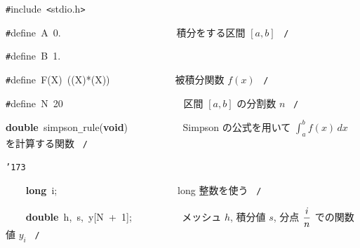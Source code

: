 \documentclass[a4paper,10pt]{article}
\def\mc{\relax}
\begin{document}
\noindent
\mbox{}{\tt\#}include{\tt\mc \ }{\tt <}stdio.h{\tt >}

\noindent
\mbox{}{\tt\#}define{\tt\mc \ }A{\tt\mc \ }0.{\tt\mc \ }{\tt\mc \ }{\tt\mc \ }{\tt\mc \ }{\tt\mc \ }{\tt\mc \ }{\tt\mc \ }{\tt\mc \ }{\tt\mc \ }{\tt\mc \ }{\tt\mc \ }{\tt\mc \ }{\tt\mc \ }{\tt\mc \ }{\tt\mc \ }{\tt\mc \ }{\tt\mc \ }{\tt\mc \ }{\tt\mc \ }{\tt\mc \ }{\tt\mc \ }{\tt\mc \ }\rm\mc {\tt /}{\tt *}\  積分をする区間 $[a, b]$ \hfill \rm\mc \ {\tt *}{\tt /}
\tt\mc 

\noindent
\mbox{}{\tt\#}define{\tt\mc \ }B{\tt\mc \ }1.

\noindent
\mbox{}{\tt\#}define{\tt\mc \ }F(X){\tt\mc \ }((X)*(X)){\tt\mc \ }{\tt\mc \ }{\tt\mc \ }{\tt\mc \ }{\tt\mc \ }{\tt\mc \ }{\tt\mc \ }{\tt\mc \ }{\tt\mc \ }{\tt\mc \ }{\tt\mc \ }{\tt\mc \ }\rm\mc {\tt /}{\tt *}\  被積分関数 $f(x)$ \hfill \rm\mc \ {\tt *}{\tt /}
\tt\mc 

\noindent
\mbox{}{\tt\#}define{\tt\mc \ }N{\tt\mc \ }20{\tt\mc \ }{\tt\mc \ }{\tt\mc \ }{\tt\mc \ }{\tt\mc \ }{\tt\mc \ }{\tt\mc \ }{\tt\mc \ }{\tt\mc \ }{\tt\mc \ }{\tt\mc \ }{\tt\mc \ }{\tt\mc \ }{\tt\mc \ }{\tt\mc \ }{\tt\mc \ }{\tt\mc \ }{\tt\mc \ }{\tt\mc \ }{\tt\mc \ }{\tt\mc \ }{\tt\mc \ }\rm\mc {\tt /}{\tt *}\  \ 区間 $[a, b]$ の分割数 $n$ \hfill \rm\mc \ {\tt *}{\tt /}
\tt\mc 

\noindent
\mbox{}\hfill

\noindent
\mbox{}\textbf{double}{\tt\mc \ }simpson{\tt\_}rule(\textbf{void}){\tt\mc \ }{\tt\mc \ }{\tt\mc \ }{\tt\mc \ }{\tt\mc \ }{\tt\mc \ }{\tt\mc \ }{\tt\mc \ }{\tt\mc \ }\rm\mc {\tt /}{\tt *}\  \ Simpson の公式を用いて $\displaystyle\int_a^b f(x)\,dx$ を計算する関数 \hfill \rm\mc \ {\tt *}{\tt /}
\tt\mc 

\noindent
\mbox{}{\tt\char'173}

\noindent
\mbox{}{\tt\mc \ }{\tt\mc \ }{\tt\mc \ }{\tt\mc \ }\textbf{long}{\tt\mc \ }i;{\tt\mc \ }{\tt\mc \ }{\tt\mc \ }{\tt\mc \ }{\tt\mc \ }{\tt\mc \ }{\tt\mc \ }{\tt\mc \ }{\tt\mc \ }{\tt\mc \ }{\tt\mc \ }{\tt\mc \ }{\tt\mc \ }{\tt\mc \ }{\tt\mc \ }{\tt\mc \ }{\tt\mc \ }{\tt\mc \ }{\tt\mc \ }{\tt\mc \ }{\tt\mc \ }{\tt\mc \ }{\tt\mc \ }\rm\mc {\tt /}{\tt *}\  long 整数を使う \hfill \rm\mc \ {\tt *}{\tt /}
\tt\mc 

\noindent
\mbox{}{\tt\mc \ }{\tt\mc \ }{\tt\mc \ }{\tt\mc \ }\textbf{double}{\tt\mc \ }h,{\tt\mc \ }s,{\tt\mc \ }y[N{\tt\mc \ }+{\tt\mc \ }1];{\tt\mc \ }{\tt\mc \ }{\tt\mc \ }{\tt\mc \ }{\tt\mc \ }{\tt\mc \ }{\tt\mc \ }{\tt\mc \ }\rm\mc {\tt /}{\tt *}\  \ メッシュ $h$, 積分値 $s$, 分点 $\displaystyle{i\over n}$ での関数値 $y_i$ \hfill \rm\mc \ {\tt *}{\tt /}
\tt\mc 
\end{document}
